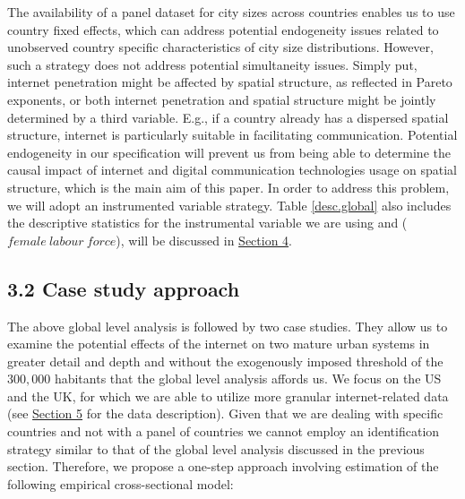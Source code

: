 \documentclass[10pt,letterpaper]{article}
\begin{document}
\color{black}

\begin{table}

\caption{\label{tab:unnamed-chunk-4}Correlations between ICT variables\label{cor}}
\end{table}

The availability of a panel dataset for city sizes across countries
enables us to use country fixed effects, which can address potential
endogeneity issues related to unobserved country specific
characteristics of city size distributions. However, such a strategy
does not address potential simultaneity issues. Simply put, internet
penetration might be affected by spatial structure, as reflected in
Pareto exponents, or both internet penetration and spatial structure
might be jointly determined by a third variable. E.g., if a country
already has a dispersed spatial structure, internet is particularly
suitable in facilitating communication. Potential endogeneity in our
specification will prevent us from being able to determine the causal
impact of internet and digital communication technologies usage on
spatial structure, which is the main aim of this paper. In order to
address this problem, we will adopt an instrumented variable strategy.
Table \ref{desc.global} also includes the descriptive statistics for the
instrumental variable we are using and (\(female\:labour\:force\)), will
be discussed in \protect\hyperlink{sec4}{Section 4}.

\hypertarget{sec3.2}{%
\subsection{3.2 Case study approach}\label{sec3.2}}

The above global level analysis is followed by two case studies. They
allow us to examine the potential effects of the internet on two mature
urban systems in greater detail and depth and without the exogenously
imposed threshold of the \(300,000\) habitants that the global level
analysis affords us. We focus on the US and the UK, for which we are
able to utilize more granular internet-related data (see
\protect\hyperlink{sec5}{Section 5} for the data description). Given
that we are dealing with specific countries and not with a panel of
countries we cannot employ an identification strategy similar to that of
the global level analysis discussed in the previous section. Therefore,
we propose a one-step approach involving estimation of the following
empirical cross-sectional model:
\end{document}
